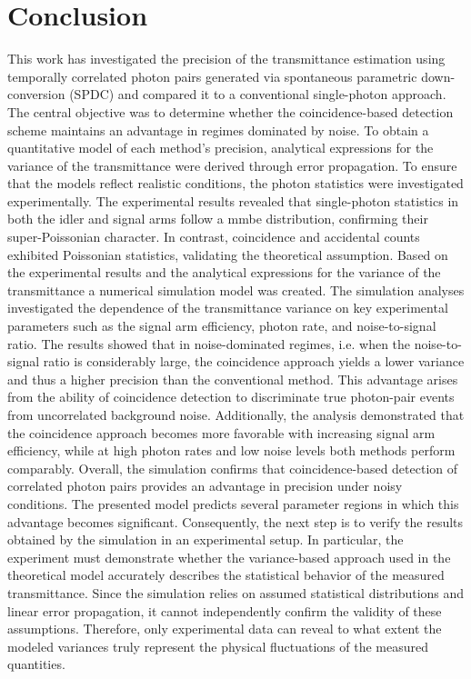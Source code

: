 \section{Conclusion}
This work has investigated the precision of the transmittance estimation using temporally correlated photon pairs generated via spontaneous parametric down-conversion (SPDC) and compared it to a conventional single-photon approach. The central objective was to determine whether the coincidence-based detection scheme maintains an advantage in regimes dominated by noise. \newline
To obtain a quantitative model of each method’s precision, analytical expressions for the variance of the transmittance were derived through error propagation. To ensure that the models reflect realistic conditions, the photon statistics were investigated experimentally. \newline
The experimental results revealed that single-photon statistics in both the idler and signal arms follow a \acrshort{mmbe} distribution, confirming their super-Poissonian character. In contrast, coincidence and accidental counts exhibited Poissonian statistics, validating the theoretical assumption. Based on the experimental results and the analytical expressions for the variance of the transmittance a numerical simulation model was created. \newline
The simulation analyses investigated the dependence of the transmittance variance on key experimental parameters such as the signal arm efficiency, photon rate, and noise-to-signal ratio. The results showed that in noise-dominated regimes, i.e. when the noise-to-signal ratio is considerably large, the coincidence approach yields a lower variance and thus a higher precision than the conventional method. This advantage arises from the ability of coincidence detection to discriminate true photon-pair events from uncorrelated background noise. Additionally, the analysis demonstrated that the coincidence approach becomes more favorable with increasing signal arm efficiency, while at high photon rates and low noise levels both methods perform comparably. \newline
Overall, the simulation confirms that coincidence-based detection of correlated photon pairs provides an advantage in precision under noisy conditions. The presented model predicts several parameter regions in which this advantage becomes significant. \newline Consequently, the next step is to verify the results obtained by the simulation in an experimental setup. In particular, the experiment must demonstrate whether the variance-based approach used in the theoretical model accurately describes the statistical behavior of the measured transmittance. Since the simulation relies on assumed statistical distributions and linear error propagation, it cannot independently confirm the validity of these assumptions. Therefore, only experimental data can reveal to what extent the modeled variances truly represent the physical fluctuations of the measured quantities. \newline

